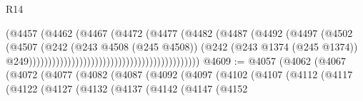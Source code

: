 \begin{lexlean}{R14}
\begin{coremodule}
                                                                  (@4457
                                                                    (@4462
                                                                      (@4467
                                                                        (@4472
                                                                          (@4477
                                                                            (@4482
                                                                              (@4487
                                                                                (@4492
                                                                                  (@4497
                                                                                    (@4502
                                                                                      (@4507
                                                                                        (@242
                                                                                          (@243
                                                                                            @4508
                                                                                            (@245
                                                                                              @4508))
                                                                                          (@242
                                                                                            (@243
                                                                                              @1374
                                                                                              (@245
                                                                                                @1374))
                                                                                            @249))))))))))))))))))))))))))))))))))))))))))))
@4609 := @4057
    (@4062
      (@4067
        (@4072
          (@4077
            (@4082
              (@4087
                (@4092
                  (@4097
                    (@4102
                      (@4107
                        (@4112
                          (@4117
                            (@4122
                              (@4127
                                (@4132
                                  (@4137
                                    (@4142
                                      (@4147
                                        (@4152

\end{coremodule}
\end{lexlean}
